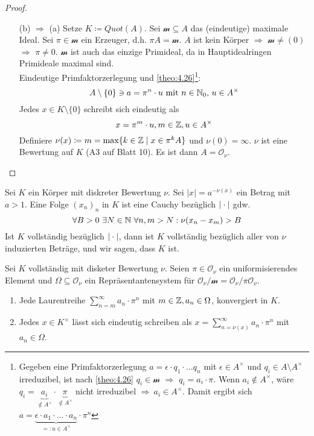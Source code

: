 \documentclass[../main.tex]{subfiles}
\begin{document}
\begin{proof}
\begin{itemize}
        \item[(b) $\Rightarrow$ (a)]
        Setze $K\coloneqq Quot(A)$. Sei $\mathcal{m}\subseteq A$ das (eindeutige) maximale Ideal.
        Sei $\pi\in \mathcal{m}$ ein Erzeuger, d.h. $\pi A = \mathcal{m}$.
        $A$ ist kein Körper $\Longrightarrow$ $\mathcal{m}\neq (0)$ $\Longrightarrow$ $\pi\neq 0$.
        $\mathcal{m}$ ist auch das einzige Primideal, da in Hauptidealringen Primideale maximal sind.\\
        Eindeutige Primfaktorzerlegung und \ref{theo:4.26}\footnote{ Gegeben eine Primfaktorzerlegung $a=\epsilon\cdot q_1\cdot\dots q_n$ mit $\epsilon\in A^\times$ und $q_i\in A\setminus A^\times$ irreduzibel, ist nach \ref{theo:4.26} $q_i\in \mathcal{m}$ $\Rightarrow$ $q_i = a_i \cdot \pi$. Wenn $a_i\notin A^\times$, wäre $q_i = \underbrace{a_i}_{\notin A^\times}\cdot \underbrace{\pi}_{\notin A^\times}$ nicht irreduzibel \Lightning $\Rightarrow\ a_i\in A^\times$. Damit ergibt sich $a=\underbrace{\epsilon\cdot a_1\cdot \dots \cdot a_n}_{=:u\in A^\times} \cdot \pi^{n}$}:
        $$A\setminus\{0\} \ni a = \pi^n\cdot u\text{ mit }n\in \mathbb{N}_0\text{, }u\in A^\times$$
        Jedes $x\in K\setminus\{0\}$ schreibt sich eindeutig als
        $$x = \pi^m\cdot u,m\in \mathbb{Z}, u\in A^\times$$
        Definiere $\nu(x)\coloneqq m = \max \{k\in \mathbb{Z}\mid x\in \pi^kA\}$ und $\nu(0) = \infty$.
        $\nu$ ist eine Bewertung auf $K$ (A3 auf Blatt 10).
        Es ist dann $A=\mathcal{O}_\nu$.
    \end{itemize}
    
\end{proof}

\begin{remark}
    Sei $K$ ein Körper mit diskreter Bewertung $\nu$.
    Sei $|x| = a^{-\nu(x)}$ ein Betrag mit $a>1$.
    Eine Folge $(x_n)_n$ in $K$ ist eine Cauchy bezüglich $|\cdot|$ gdw.
    $$\forall B>0\ \exists N\in \mathbb{N}\ \forall n,m>N: \nu(x_n-x_m)>B$$
    Ist $K$ vollständig bezüglich $|\cdot|$, dann ist $K$ vollständig bezüglich aller von $\nu$ induzierten Beträge, und wir sagen, dass $K$  ist.
\end{remark}

\begin{theorem}\label{theo:4.31}
    Sei $K$ vollständig mit disketer Bewertung $\nu$.
    Seien $\pi\in \mathcal{O}_\nu$ ein uniformisierendes Element und $\Omega\subseteq \mathcal{O}_\nu$ ein Repräsentantensystem für $\mathcal{O}_\nu/\mathcal{m} = \mathcal{O}_\nu/\pi \mathcal{O}_\nu$.
    \begin{enumerate}[label=(\alph*)]
        \item Jede Laurentreihe $\sum_{n=m}^\infty a_n\cdot \pi^n$ mit $m\in \mathbb{Z}, a_n\in \Omega$, konvergiert in $K$.
        \item Jedes $x\in K^\times$ lässt sich eindeutig schreiben als $x=\sum_{n = \nu(x)}^\infty a_n\cdot \pi^n$ mit $a_n\in \Omega$.
    \end{enumerate}
\end{theorem}
\end{document}
